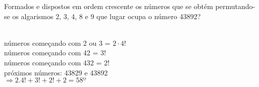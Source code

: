 \begin{ex}
 	Formados e dispostos em ordem crescente os números que se obtém permutando-se os algarismos 2, 3, 4, 8 e 9 que lugar ocupa o número 43892?
 	   \begin{sol}
 	      \phantom{A}  \\
 	      números começando com 2 ou 3 = $2\cdot4!$  \\
 	      números  começando com 42 = $3!$  \\
 	      números começando com 432 = $2!$  \\
 	      próximos números: 43829 e 43892 \\
 	      $\Longrightarrow 2.4! + 3! + 2! + 2 = 58º$
 	      
 	   \end{sol}
\end{ex}